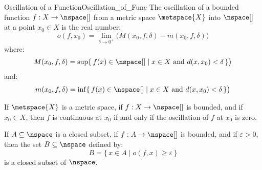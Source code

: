         \begin{fdefinition}{Oscillation of a Function}{Oscillation_of_Func}
            The oscillation of a bounded function $f:X\rightarrow\nspace[]$
            from a metric space $\metspace{X}$ into $\nspace[]$ at a point
            $x_{0}\in{X}$ is the real number:
            \begin{equation*}
                o(f,x_{0})=\underset{\delta\rightarrow{0}^{+}}{\lim}
                    \big(M(x_{0},f,\delta)-m(x_{0},f,\delta)\big)
            \end{equation*}
            where:
            \begin{equation*}
                M(x_{0},f,\delta)=\sup\{\,f(x)\in\nspace[]\;|\;
                        x\in{X}\textrm{ and }d(x,x_{0})<\delta\,\}\big)
            \end{equation*}
            and:
            \begin{equation*}
                m(x_{0},f,\delta)=\inf\{\,f(x)\in\nspace[]\;|\;
                        x\in{X}\textrm{ and }d(x,x_{0})<\delta\,\}\big)
            \end{equation*}
        \end{fdefinition}
        \begin{theorem}
            If $\metspace{X}$ is a metric space, if $f:X\rightarrow\nspace[]$ is
            bounded, and if $x_{0}\in{X}$, then $f$ is continuous at $x_{0}$ if
            and only if the oscillation of $f$ at $x_{0}$ is zero.
        \end{theorem}
        \begin{theorem}
            If $A\subseteq\nspace$ is a closed subset, if
            $f:A\rightarrow\nspace[]$ is bounded, and if $\varepsilon>0$, then
            the set $B\subseteq\nspace$ defined by:
            \begin{equation}
                B=\{\,x\in{A}\;|\;o(f,x)\geq\varepsilon\,\}
            \end{equation}
            is a closed subset of $\nspace$.
        \end{theorem}
